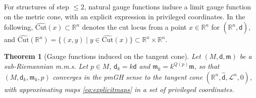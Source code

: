 \documentclass[11pt,a4paper]{article}
\theoremstyle{plain}
\newtheorem{theorem}{Theorem}[section]
\theoremstyle{definition}
\theoremstyle{remark}
\numberwithin{equation}{section}
\newcommand{\R}{\mathbb{R}} %
\newcommand{\Cut}{\mathrm{Cut}}
\newcommand{\mm}{\mathfrak m}
\newcommand{\sfd}{\mathsf d}
\begin{document}
For structures of step $\leq 2$, natural gauge functions induce a limit gauge function on the metric cone, with an explicit expression in privileged coordinates. In the following, $\widehat{\Cut}(x)\subset\R^n$ denotes the cut locus from a point $x\in \R^n$ for $(\R^n,\hat{\sfd})$, and $\widehat{\Cut}(\R^n) = \{(x,y)\mid y\in \widehat{\Cut}(x)\}\subset \R^n\times \R^n$.

\begin{theorem}[Gauge functions induced on the tangent cone]\label{thm:naturalconvergencestep2}
Let $(M,\sfd,\mm)$ be a sub-Riemannian m.m.s. Let $p\in M$, $\sfd_k = k\sfd$ and $\mm_k = k^{Q(p)}\mm$, so that $(M,\sfd_k,\mm_k,p)$ converges in the pmGH sense to the tangent cone $(\R^n,\hat{\sfd},\mathscr{L}^n,0)$, with approximating maps \eqref{eq:explicitmaps} in a set of privileged coordinates.


\end{theorem}
\end{document}
